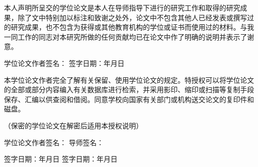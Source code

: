
\clearpage{\cleardoublepage} %
\thispagestyle{empty} %
\setlength{\baselineskip}{20pt} %

\vspace*{1cm}

\begin{center}\end{center}

\vspace{0.5cm}

本人声明所呈交的学位论文是本人在导师指导下进行的研究工作和取得的研究成果，除了文中特别加以标注和致谢之处外，论文中不包含其他人已经发表或撰写过的研究成果，也不包含为获得{\underline{\textbf{}}}或其他教育机构的学位或证书而使用过的材料。与我一同工作的同志对本研究所做的任何贡献均已在论文中作了明确的说明并表示了谢意。

\vspace{1.5cm}

\noindent 学位论文作者签名：\makebox[4cm][s]{} 签字日期：\makebox[1.5cm][s]{}年\makebox[1cm][s]{}月\makebox[1cm][s]{}日

\vspace{2.5cm}

\begin{center}\end{center}

\vspace{1cm}

本学位论文作者完全了解{\underline{}}有关保留、使用学位论文的规定。特授权{\underline{}}可以将学位论文的全部或部分内容编入有关数据库进行检索，并采用影印、缩印或扫描等复制手段保存、汇编以供查阅和借阅。同意学校向国家有关部门或机构送交论文的复印件和磁盘。

（保密的学位论文在解密后适用本授权说明）

\vspace{2.2cm}

\noindent 学位论文作者签名：\makebox[4cm][s]{} 导师签名：\makebox[4cm][s]{}

\vspace{0.8cm}

\noindent 签字日期：\makebox[1.5cm][s]{}年\makebox[1cm][s]{}月\makebox[1cm][s]{}日
\qquad 签字日期：\makebox[1.5cm][s]{}年\makebox[1cm][s]{}月\makebox[1cm][s]{}日
